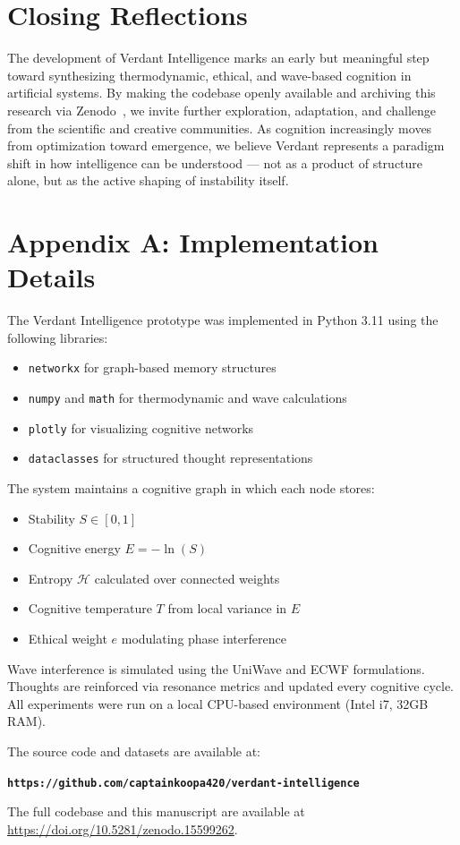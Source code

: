 \documentclass{article}
\begin{document}
\section*{Closing Reflections}

The development of Verdant Intelligence marks an early but meaningful step toward synthesizing thermodynamic, ethical, and wave-based cognition in artificial systems. By making the codebase openly available and archiving this research via Zenodo~\cite{verdant2025}, we invite further exploration, adaptation, and challenge from the scientific and creative communities. As cognition increasingly moves from optimization toward emergence, we believe Verdant represents a paradigm shift in how intelligence can be understood — not as a product of structure alone, but as the active shaping of instability itself.

\section*{Appendix A: Implementation Details}

The Verdant Intelligence prototype was implemented in Python 3.11 using the following libraries:

\begin{itemize}
    \item \texttt{networkx} for graph-based memory structures
    \item \texttt{numpy} and \texttt{math} for thermodynamic and wave calculations
    \item \texttt{plotly} for visualizing cognitive networks
    \item \texttt{dataclasses} for structured thought representations
\end{itemize}

The system maintains a cognitive graph in which each node stores:

\begin{itemize}
    \item Stability $S \in [0, 1]$
    \item Cognitive energy $E = -\ln(S)$
    \item Entropy $\mathcal{H}$ calculated over connected weights
    \item Cognitive temperature $T$ from local variance in $E$
    \item Ethical weight $e$ modulating phase interference
\end{itemize}

Wave interference is simulated using the UniWave and ECWF formulations. Thoughts are reinforced via resonance metrics and updated every cognitive cycle. All experiments were run on a local CPU-based environment (Intel i7, 32GB RAM).

The source code and datasets are available at:

\texttt{\textbf{https://github.com/captainkoopa420/verdant-intelligence}}


The full codebase and this manuscript are available at \url{https://doi.org/10.5281/zenodo.15599262}.




\end{document}
